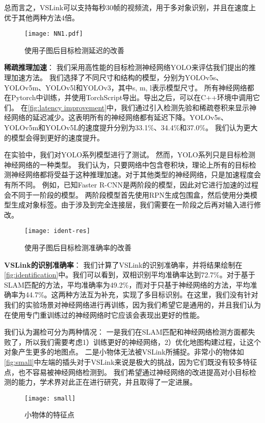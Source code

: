 总而言之，VSLink可以支持每秒30帧的视频流，用于多对象识别，并且在速度上优于其他两种方法$4$倍。

\begin{figure}[htbp]
	\centering
	\texttt{[image: NN1.pdf]}
	\caption{使用子图后目标检测延迟的改善}
	\label{fig:latency improvement}
\end{figure}

\textbf{稀疏推理加速}：
我们采用高性能的目标检测神经网络YOLO\cite{redmon2016you}来评估我们提出的推理加速方法。
我们选择了不同尺寸和结构的模型，分别为YOLOv5s、YOLOv5m、YOLOv5l和YOLOv3，其中s, m, l表示模型尺寸。
所有神经网络都在Pytorch中训练，并使用TorchScript导出。导出之后，可以在C++环境中调用它们。
在\autoref{fig:latency improvement}中，我们通过引入检测先验和稀疏卷积来显示神经网络的延迟减少。这表明所有的神经网络都有延迟下降。YOLOv5s、YOLOv5m和YOLOv5L的速度提升分别为33.1\%、34.4\%和37.0\%。
我们认为更大的模型会得到更好的速度提升。

在实验中，我们对YOLO系列模型进行了测试。
然而，YOLO系列只是目标检测神经网络的一种类型。
我们认为，只要网络中包含卷积块，理论上所有的目标检测神经网络都将受益于这种推理加速。对于其他类型的神经网络，只是加速程度会有所不同。
例如，已知Faster R-CNN是两阶段的模型，因此对它进行加速的过程会不同于一阶段的模型。
两阶段模型首先使用RPN生成包围盒，然后使用分类模型生成对象标签。由于涉及到完全连接层，我们需要在一阶段之后再对输入进行修改。


\begin{figure*}[htbp]
	\centering
	\texttt{[image: ident-res]}
	\caption{使用子图后目标检测准确率的改善}
	\label{fig:identification}
\end{figure*}

\textbf{VSLink的识别准确率}：
我们计算了VSLink的识别准确率，并将结果绘制在\autoref{fig:identification}中。我们可以看到，双相识别平均准确率达到72.7\%。对于基于SLAM匹配的方法，平均准确率为49.2\%，而对于只基于神经网络的方法，平均准确率为44.7\%。这两种方法互为补充，实现了多目标识别。在这里，我们没有针对我们的实验场景对神经网络进行再训练，因为我们希望它是通用的，并且我们认为在使用专门重训练过的神经网络时它应该会表现出更好的性能。

我们认为漏检可分为两种情况：
一是我们在SLAM匹配和神经网络检测方面都失败了，所以我们需要考虑1）训练更好的神经网络，2）优化地图构建过程，让这个对象产生更多的地图点。
二是小物体无法被VSLink所捕捉。非常小的物体如\autoref{fig:small}中左端的插头对于VSLink来说是极大的挑战，因为它们既没有较多特征点，也不容易被神经网络检测到。
我们希望通过神经网络的改进提高对小目标检测的能力，学术界对此正在进行研究，并且取得了一定进展。
\begin{figure}[htbp]
	\centering
	\texttt{[image: small]}
	\caption{小物体的特征点}
	\label{fig:small}
\end{figure}

